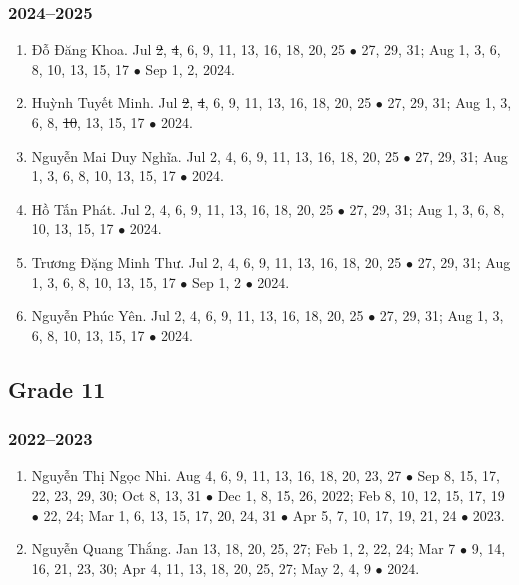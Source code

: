 \documentclass{article}
\begin{document}
\subsubsection{2024--2025}

\begin{enumerate}
	\item {\sc Đỗ Đăng Khoa.} Jul \st{2}, \st{4}, 6, 9, 11, 13, 16, 18, 20, 25 $\bullet$ 27, 29, 31; Aug 1, 3, 6, 8, 10, 13, 15, 17 $\bullet$ Sep 1, 2, 2024.
	\item {\sc Huỳnh Tuyết Minh.} Jul \st{2}, \st{4}, 6, 9, 11, 13, 16, 18, 20, 25 $\bullet$ 27, 29, 31; Aug 1, 3, 6, 8, \st{10}, 13, 15, 17 $\bullet$ 2024.
	\item {\sc Nguyễn Mai Duy Nghĩa.} Jul 2, 4, 6, 9, 11, 13, 16, 18, 20, 25 $\bullet$ 27, 29, 31; Aug 1, 3, 6, 8, 10, 13, 15, 17 $\bullet$ 2024.
	\item {\sc Hồ Tấn Phát.} Jul 2, 4, 6, 9, 11, 13, 16, 18, 20, 25 $\bullet$ 27, 29, 31; Aug 1, 3, 6, 8, 10, 13, 15, 17 $\bullet$ 2024.
	\item {\sc Trương Đặng Minh Thư.} Jul 2, 4, 6, 9, 11, 13, 16, 18, 20, 25 $\bullet$ 27, 29, 31; Aug 1, 3, 6, 8, 10, 13, 15, 17 $\bullet$ Sep 1, 2 $\bullet$ 2024.
	\item {\sc Nguyễn Phúc Yên.} Jul 2, 4, 6, 9, 11, 13, 16, 18, 20, 25 $\bullet$ 27, 29, 31; Aug 1, 3, 6, 8, 10, 13, 15, 17 $\bullet$ 2024.
\end{enumerate}


\subsection{Grade 11}

\subsubsection{2022--2023}

\begin{enumerate}
	\item {\sc Nguyễn Thị Ngọc Nhi.} {\sf[In]} Aug 4, 6, 9, 11, 13, 16, 18, 20, 23, 27 $\bullet$ Sep 8, 15, 17, 22, 23, 29, 30; Oct 8, 13, 31 $\bullet$ Dec 1, 8,  15, 26, 2022; Feb 8, 10, 12, 15, 17, 19 $\bullet$ 22, 24; Mar 1, 6, 13, 15, 17, 20, 24, 31 $\bullet$ Apr 5, 7, 10, 17, 19, 21, 24 $\bullet$ 2023. {\sf[Out]}
	\item {\sc Nguyễn Quang Thắng.} {\sf[In]} Jan 13, 18, 20, 25, 27; Feb 1, 2, 22, 24; Mar 7 $\bullet$ 9, 14, 16, 21, 23, 30; Apr 4, 11, 13, 18, 20, 25, 27; May 2, 4, 9 $\bullet$ 2024.
\end{enumerate}
\end{document}
